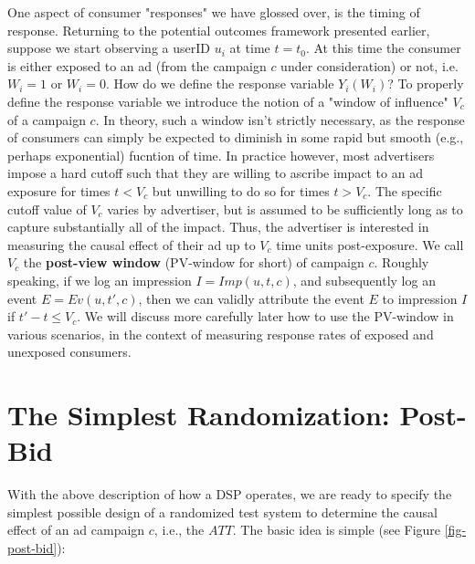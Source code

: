 \documentclass[11pt,a4paper]{article}
\theoremstyle{definition}
\theoremstyle{remark}
\theoremstyle{definition}
\theoremstyle{definition}
\theoremstyle{definition}
\theoremstyle{definition}
\theoremstyle{definition}
\theoremstyle{definition}
\begin{document}
One aspect of consumer "responses" we have glossed over, is the timing of response. Returning to the potential outcomes framework presented earlier, suppose we start observing a userID $u_i$ at time $t = t_0$. At this time the consumer is either exposed to an ad (from the campaign $c$ under consideration) or not, i.e. $W_i = 1$ or $W_i=0$. How do we define the response variable $Y_i(W_i)$? To properly define the response variable we introduce the notion of a "window of influence" $V_c$ of a campaign $c$. In theory, such a window isn't strictly necessary, as the response of consumers can simply be expected to diminish in some rapid but smooth (e.g., perhaps exponential) fucntion of time. In practice however, most advertisers impose a hard cutoff such that they are willing to ascribe impact to an ad exposure for times $t < V_c$ but unwilling to do so for times $t > V_c$. The specific cutoff value of $V_c$ varies by advertiser, but is assumed to be sufficiently long as to capture substantially all of the impact. Thus, the advertiser is interested in measuring the causal effect of their ad up to $V_c$ time units post-exposure. We call $V_c$ the {\bf post-view window} (PV-window for short) of campaign $c$. Roughly speaking, if we log an impression $I = Imp(u,t,c)$, and subsequently log an event $E = Ev(u,t',c)$, then we can validly attribute the event $E$ to impression $I$ if $t' - t \leq V_c$. We will discuss more carefully later how to use the PV-window in various scenarios, in the context of measuring response rates of exposed and unexposed consumers.


\section{The Simplest Randomization: Post-Bid} \label{sec-psa}

With the above description of how a DSP operates, we are ready to specify the simplest possible design of a randomized test system to determine the causal effect of an ad campaign $c$, i.e., the $ATT$. 
The basic idea is simple (see Figure \ref{fig-post-bid}):
\end{document}
